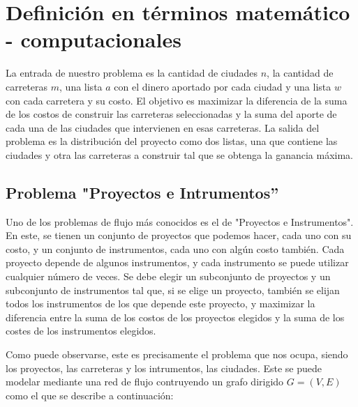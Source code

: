 \documentclass[10pt]{article} %
\begin{document}
	\section{Definici\'on en t\'erminos matem\'atico - computacionales}\label{section_2}
	
	La entrada de nuestro problema es la cantidad de ciudades $n$, la cantidad de carreteras $m$, una lista $a$ con el dinero aportado por cada ciudad y una lista $w$ con cada carretera  y su costo. El objetivo es maximizar la diferencia de la suma de los costos de construir las carreteras seleccionadas y la suma del aporte de cada una de las ciudades que intervienen en esas carreteras. La salida del problema es la distribuci\'on del proyecto como dos listas, una que contiene las ciudades y otra las carreteras a construir tal que se obtenga la ganancia m\'axima.
	
	\subsection{Problema "Proyectos e Intrumentos''}
	
	Uno de los problemas de flujo más conocidos es el de "Proyectos e Instrumentos". En este, se tienen un conjunto de proyectos que podemos hacer, cada uno con su costo, y un conjunto de instrumentos, cada uno con algún costo tambi\'en. Cada proyecto depende de algunos instrumentos, y cada instrumento se puede utilizar cualquier número de veces. Se debe elegir un subconjunto de proyectos y un subconjunto de instrumentos tal que, si se elige un proyecto, también se elijan todos los instrumentos de los que depende este proyecto, y maximizar la diferencia entre la suma de los costos de los proyectos elegidos y la suma de los costes de los instrumentos elegidos.
	
	Como puede observarse, este es precisamente el problema que nos ocupa, siendo los proyectos, las carreteras y los intrumentos, las ciudades. Este se puede modelar mediante una red de flujo contruyendo un grafo dirigido $G = (V, E)$ como el que se describe a continuaci\'on:
	
\end{document}
